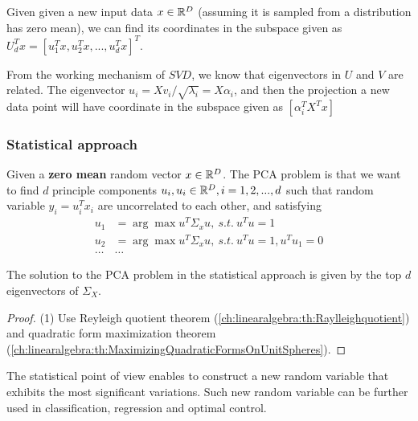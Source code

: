 \begin{refsection}
\begin{lemma}
Given given a new input data $x\in \mathbb{R}^D$ (assuming it is sampled from a distribution has zero mean), we can find its coordinates in the subspace given as $U_d^T x = [u_1^Tx,u_2^Tx,...,u_d^Tx]^T$.
\end{lemma}


\begin{lemma}
From the working mechanism of $SVD$, we know that eigenvectors in $U$ and $V$ are related.
The eigenvector $u_i = Xv_i/\sqrt{\lambda_i} = X\alpha_i$, and then the projection a new data point will have coordinate in the subspace given as
$[\alpha_i^T X^Tx]$
\end{lemma}


\subsubsection{Statistical approach}
\begin{definition}
Given a \textbf{zero mean}   random  vector $x\in \mathbb{R}^D$. The PCA problem is that we want to find $d$ principle components $u_i,u_i\in \mathbb{R}^D, i=1,2,...,d$ such that random variable $y_i = u_i^T x_i$ are uncorrelated to each other, and satisfying
\begin{align*}
    u_1 &= \arg \max u^T\Sigma_x u, ~s.t.~  u^Tu = 1  \\
    u_2 &= \arg \max u^T\Sigma_x u, ~s.t.~ u^Tu=1,u^Tu_1 = 0\\
    \dots & \dots
\end{align*}
\end{definition}

\begin{theorem}
The solution to the PCA problem in the statistical approach is given by the top $d$ eigenvectors of $\Sigma_X$.
\end{theorem}
\begin{proof}
(1) Use Reyleigh quotient theorem (\autoref{ch:linearalgebra:th:Raylleighquotient}) and quadratic form maximization theorem (\autoref{ch:linearalgebra:th:MaximizingQuadraticFormsOnUnitSpheres}). 
\end{proof}


\begin{remark}[implications]
The statistical point of view enables to construct a new random variable that exhibits the most significant variations. Such new random variable can be further used in classification, regression and optimal control.
\end{remark}



\end{refsection}
